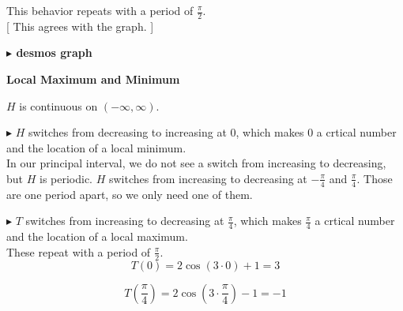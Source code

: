 \documentclass{ximera}
\begin{document}
This behavior repeats with a period of $\frac{\pi}{2}$. \\



[ This agrees with the graph. ]





\textbf{\textcolor{blue!55!black}{$\blacktriangleright$ desmos graph}} 
\begin{center}
\end{center}



















\textbf{\textcolor{blue!55!black}{Local Maximum and Minimum}}



$H$ is continuous on $(-\infty, \infty)$.


$\blacktriangleright$ $H$ switches from decreasing to increasing at $0$, which makes $0$ a crtical number and the location of a local minimum. \\



In our principal interval, we do not see a switch from increasing to decreasing, but $H$ is periodic.  $H$ switches from increasing to decreasing at $-\frac{\pi}{4}$ and $\frac{\pi}{4}$.  Those are one period apart, so we only need one of them.

$\blacktriangleright$ $T$ switches from increasing to decreasing at $\frac{\pi}{4}$, which makes $\frac{\pi}{4}$ a crtical number and the location of a local maximum. \\


These repeat with a period of $\frac{\pi}{2}$. \\



\[
T\left(0 \right) = 2 \cos\left(3 \cdot 0 \right) + 1 = 3
\]




\[
T\left( \frac{\pi}{4} \right) = 2 \cos\left(3 \cdot \frac{\pi}{4} \right) - 1 = -1
\]
\end{document}
